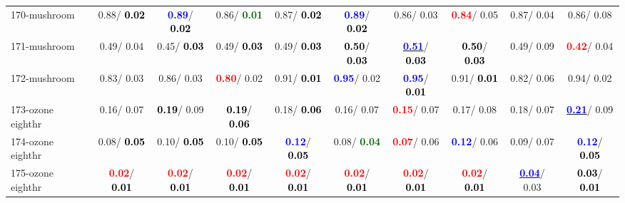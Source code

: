\begin{table}[h]
\begin{center}
{\begin{tabular}{lc|c|c|c|c|c|c|c|c}
170-mushroom &   0.88/\textcolor{black}{\textbf{  0.02}} & \textcolor{blue}{\textbf{  0.89}}/\textcolor{black}{\textbf{  0.02}} &   0.86/\textcolor{darkgreen}{\textbf{  0.01}} &   0.87/\textcolor{black}{\textbf{  0.02}} & \textcolor{blue}{\textbf{  0.89}}/\textcolor{black}{\textbf{  0.02}} &   0.86/  0.03 & \textcolor{red}{\textbf{  0.84}}/  0.05 &   0.87/  0.04 &   0.86/  0.08 \\
171-mushroom &   0.49/  0.04 &   0.45/\textcolor{black}{\textbf{  0.03}} &   0.49/\textcolor{black}{\textbf{  0.03}} &   0.49/\textcolor{black}{\textbf{  0.03}} & \textcolor{black}{\textbf{  0.50}}/\textcolor{black}{\textbf{  0.03}} & \underline{\textcolor{blue}{\textbf{  0.51}}}/\textcolor{black}{\textbf{  0.03}} & \textcolor{black}{\textbf{  0.50}}/\textcolor{black}{\textbf{  0.03}} &   0.49/  0.09 & \textcolor{red}{\textbf{  0.42}}/  0.04 \\
172-mushroom &   0.83/  0.03 &   0.86/  0.03 & \textcolor{red}{\textbf{  0.80}}/  0.02 &   0.91/\textcolor{black}{\textbf{  0.01}} & \textcolor{blue}{\textbf{  0.95}}/  0.02 & \textcolor{blue}{\textbf{  0.95}}/\textcolor{black}{\textbf{  0.01}} &   0.91/\textcolor{black}{\textbf{  0.01}} &   0.82/  0.06 &   0.94/  0.02 \\
173-ozone eighthr &   0.16/  0.07 & \textcolor{black}{\textbf{  0.19}}/  0.09 & \textcolor{black}{\textbf{  0.19}}/\textcolor{black}{\textbf{  0.06}} &   0.18/\textcolor{black}{\textbf{  0.06}} &   0.16/  0.07 & \textcolor{red}{\textbf{  0.15}}/  0.07 &   0.17/  0.08 &   0.18/  0.07 & \underline{\textcolor{blue}{\textbf{  0.21}}}/  0.09 \\
174-ozone eighthr &   0.08/\textcolor{black}{\textbf{  0.05}} &   0.10/\textcolor{black}{\textbf{  0.05}} &   0.10/\textcolor{black}{\textbf{  0.05}} & \textcolor{blue}{\textbf{  0.12}}/\textcolor{black}{\textbf{  0.05}} &   0.08/\textcolor{darkgreen}{\textbf{  0.04}} & \textcolor{red}{\textbf{  0.07}}/  0.06 & \textcolor{blue}{\textbf{  0.12}}/  0.06 &   0.09/  0.07 & \textcolor{blue}{\textbf{  0.12}}/\textcolor{black}{\textbf{  0.05}} \\ \hline
175-ozone eighthr & \textcolor{red}{\textbf{  0.02}}/\textcolor{black}{\textbf{  0.01}} & \textcolor{red}{\textbf{  0.02}}/\textcolor{black}{\textbf{  0.01}} & \textcolor{red}{\textbf{  0.02}}/\textcolor{black}{\textbf{  0.01}} & \textcolor{red}{\textbf{  0.02}}/\textcolor{black}{\textbf{  0.01}} & \textcolor{red}{\textbf{  0.02}}/\textcolor{black}{\textbf{  0.01}} & \textcolor{red}{\textbf{  0.02}}/\textcolor{black}{\textbf{  0.01}} & \textcolor{red}{\textbf{  0.02}}/\textcolor{black}{\textbf{  0.01}} & \underline{\textcolor{blue}{\textbf{  0.04}}}/  0.03 & \textcolor{black}{\textbf{  0.03}}/\textcolor{black}{\textbf{  0.01}} \\

\end{tabular}}
\end{center}
\end{table}
